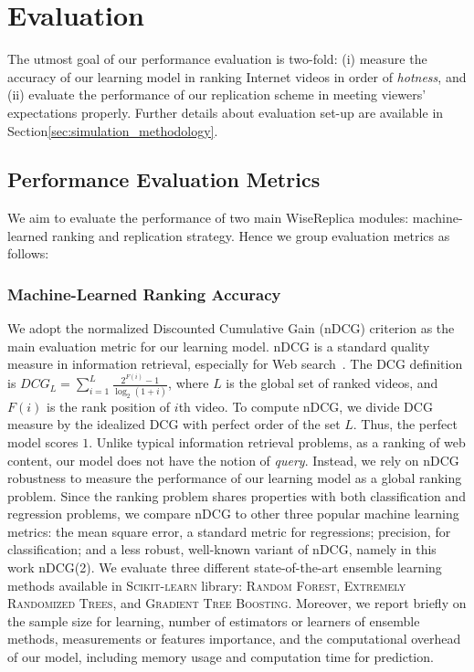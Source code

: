 \section{Evaluation}
\label{sec:evaluation}

The utmost goal of our performance evaluation is two-fold: (i) measure the accuracy of our learning model in ranking Internet videos in order of \emph{hotness}, and (ii) evaluate the performance of our replication scheme in meeting viewers' expectations properly. Further details about evaluation set-up are available in Section\ref{sec:simulation_methodology}.

\subsection{Performance Evaluation Metrics}
\label{subsec:methodology_metrics}

We aim to evaluate the performance of two main WiseReplica modules: machine-learned ranking and replication strategy. Hence we group evaluation metrics as follows:

\subsubsection{Machine-Learned Ranking Accuracy} 

We adopt the normalized Discounted Cumulative Gain (nDCG) criterion as the main evaluation metric for our learning model. nDCG is a standard quality measure in information retrieval, especially for Web search~\cite{jarvelin2002cumulated}. The DCG definition is $DCG_{L}=\sum_{i=1}^L \frac{2^{F(i)}-1}{\log_{2}(1+i)}$, where $L$ is the global set of ranked videos, and $F(i)$ is the rank position of $i$th video. To compute nDCG, we divide DCG measure by the idealized DCG with perfect order of the set $L$. Thus, the perfect model scores $1$. Unlike typical information retrieval problems, as a ranking of web content, our model does not have the notion of \emph{query}. Instead, we rely on nDCG robustness to measure the performance of our learning model as a global ranking problem. Since the ranking problem shares properties with both classification and regression problems, we compare nDCG to other three popular machine learning metrics: the mean square error, a standard metric for regressions; precision, for classification; and a less robust, well-known variant of nDCG, namely  in this work nDCG(2). We evaluate three different state-of-the-art ensemble learning methods available in \textsc{Scikit-learn} library: \textsc{Random Forest}, \textsc{Extremely Randomized Trees}, and \textsc{Gradient Tree Boosting}. Moreover, we report briefly on the sample size for learning, number of estimators or learners of ensemble methods, measurements or features importance, and the computational overhead of our model, including memory usage and computation time for prediction.


